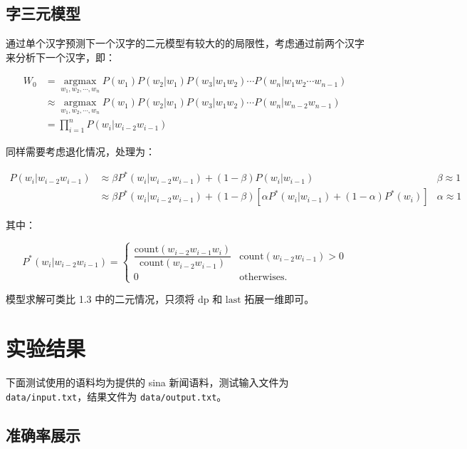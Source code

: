 \documentclass[a4paper]{article}
\begin{document}
    \subsection{字三元模型}

    通过单个汉字预测下一个汉字的二元模型有较大的的局限性，考虑通过前两个汉字来分析下一个汉字，即：

    \begin{align*}
        W_0 & = \mathop{\arg \max}\limits_{w_1, w_2, \cdots, w_n} P(w_1) P(w_2 |w_1) P(w_3 | w_1 w_2) \cdots P(w_n | w_1 w_2 \cdots w_{n - 1}) \\
        & \approx \mathop{\arg \max}\limits_{w_1, w_2, \cdots, w_n} P(w_1) P(w_2 | w_1) P(w_3 | w_1 w_2) \cdots P(w_n | w_{n - 2} w_{n - 1}) \\
        & = \prod_{i = 1}^n P(w_i | w_{i - 2} w_{i - 1})
    \end{align*}

    同样需要考虑退化情况，处理为：

    \begin{align*}
        P(w_i | w_{i - 2} w_{i - 1}) & \approx \beta P^*(w_i | w_{i - 2} w_{i - 1}) + (1 - \beta) P(w_i | w_{i - 1}) & \beta \approx 1 \\
        & \approx \beta P^*(w_i | w_{i - 2} w_{i - 1}) + (1 - \beta) \left[\alpha P^*(w_i | w_{i - 1}) + (1 - \alpha) P^*(w_i) \right] & \alpha \approx 1
    \end{align*}

    其中：

    \[P^*(w_i | w_{i - 2} w_{i - 1}) = 
    \begin{cases}
        \dfrac{\mathrm{count}(w_{i - 2} w_{i - 1} w_i)}{\mathrm{count}(w_{i - 2} w_{i - 1})} & \mathrm{count}(w_{i - 2} w_{i - 1}) > 0 \\
        0 & \text{otherwises.}
    \end{cases}\]

    模型求解可类比 1.3 中的二元情况，只须将 \(\mathrm{dp}\) 和 \(\mathrm{last}\) 拓展一维即可。

    \newpage

    \section{实验结果}

    下面测试使用的语料均为提供的 sina 新闻语料，测试输入文件为 \texttt{data/input.txt}，结果文件为 \texttt{data/output.txt}。

    \subsection{准确率展示}
\end{document}
